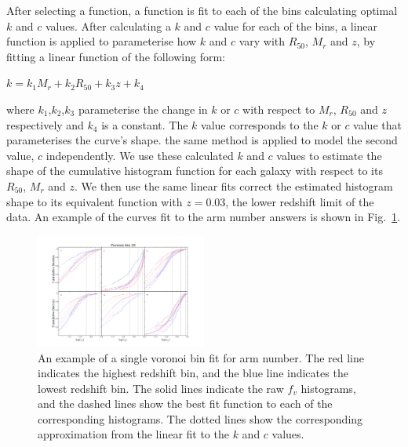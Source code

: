 \documentclass[useAMS,usenatbib]{mn2e}
\begin{document}
After selecting a function, a function is fit to each of the bins calculating optimal $k$ and $c$ values. After calculating a $k$ and $c$ value for each of the bins, a linear function is applied to parameterise how $k$ and $c$ vary with $R_{50}$, $M_r$ and $z$, by fitting a linear function of the following form:

\begin{center}
$k = k_1M_r + k_2R_{50} +k_3z + k_4$
\end{center}

where $k_1$,$k_2$,$k_3$ parameterise the change in $k$ or $c$ with respect to $M_r$, $R_{50}$ and $z$ respectively and $k_4$ is a constant. The $k$ value corresponds to the $k$ or $c$ value that parameterises the curve's shape. the same method is applied to model the second value, $c$ independently. We use these calculated $k$ and $c$ values to estimate the shape of the cumulative histogram function for each galaxy with respect to its $R_{50}$, $M_r$ and $z$. We then use the same linear fits  correct the estimated histogram shape to its equivalent function with $z=0.03$, the lower redshift limit of the data. An example of the curves fit to the arm number answers is shown in Fig.~\ref{fig:function_fit}.

\begin{figure}
		\centering

        \includegraphics[width=0.5\textwidth]{Data_imgs/fit_t11_arms_number_vbin20_kcfit1.pdf}

        \caption{An example of a single voronoi bin fit for arm number. The red line indicates the highest redshift bin, and the blue line indicates the lowest redshift bin. The solid lines indicate the raw $f_v$ histograms, and the dashed lines show the best fit function to each of the corresponding histograms. The dotted lines show the corresponding approximation from the linear fit to the $k$ and $c$ values.}

        \label{fig:function_fit}

\end{figure}
\end{document}
